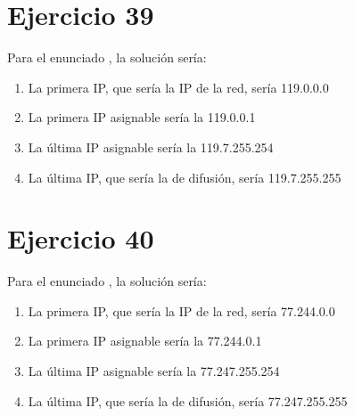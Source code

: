 \documentclass[letterpaper,10pt,spanish]{sphinxmanual}
\begin{document}
\section{Ejercicio 39}
\label{\detokenize{t2_integracion_elementos/ejercicios_subredes_ipv4/rangos_direcciones:id39}}
\sphinxAtStartPar
Para el enunciado , la solución sería:
\begin{enumerate}
%
\item {} 
\sphinxAtStartPar
La primera IP, que sería la IP de la red, sería 119.0.0.0

\item {} 
\sphinxAtStartPar
La primera IP asignable sería la 119.0.0.1

\item {} 
\sphinxAtStartPar
La última IP asignable sería la 119.7.255.254

\item {} 
\sphinxAtStartPar
La última IP, que sería la de difusión, sería 119.7.255.255

\end{enumerate}


\section{Ejercicio 40}
\label{\detokenize{t2_integracion_elementos/ejercicios_subredes_ipv4/rangos_direcciones:id40}}
\sphinxAtStartPar
Para el enunciado , la solución sería:
\begin{enumerate}
%
\item {} 
\sphinxAtStartPar
La primera IP, que sería la IP de la red, sería 77.244.0.0

\item {} 
\sphinxAtStartPar
La primera IP asignable sería la 77.244.0.1

\item {} 
\sphinxAtStartPar
La última IP asignable sería la 77.247.255.254

\item {} 
\sphinxAtStartPar
La última IP, que sería la de difusión, sería 77.247.255.255

\end{enumerate}
\end{document}
